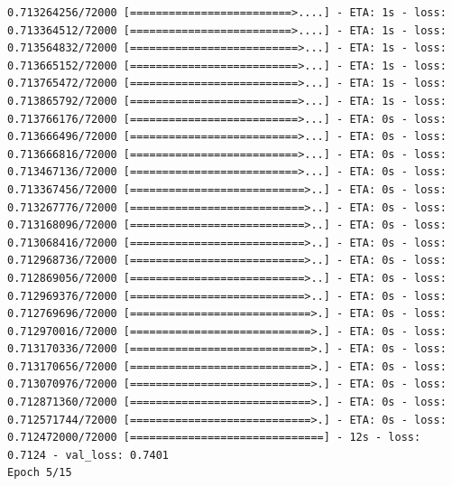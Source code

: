 \documentclass[12pt,fleqn]{article}\usepackage{../../common}
\begin{document}
\begin{verbatim}
0.713264256/72000 [=========================>....] - ETA: 1s - loss: 0.713364512/72000 [=========================>....] - ETA: 1s - loss: 0.713564832/72000 [==========================>...] - ETA: 1s - loss: 0.713665152/72000 [==========================>...] - ETA: 1s - loss: 0.713765472/72000 [==========================>...] - ETA: 1s - loss: 0.713865792/72000 [==========================>...] - ETA: 1s - loss: 0.713766176/72000 [==========================>...] - ETA: 0s - loss: 0.713666496/72000 [==========================>...] - ETA: 0s - loss: 0.713666816/72000 [==========================>...] - ETA: 0s - loss: 0.713467136/72000 [==========================>...] - ETA: 0s - loss: 0.713367456/72000 [===========================>..] - ETA: 0s - loss: 0.713267776/72000 [===========================>..] - ETA: 0s - loss: 0.713168096/72000 [===========================>..] - ETA: 0s - loss: 0.713068416/72000 [===========================>..] - ETA: 0s - loss: 0.712968736/72000 [===========================>..] - ETA: 0s - loss: 0.712869056/72000 [===========================>..] - ETA: 0s - loss: 0.712969376/72000 [===========================>..] - ETA: 0s - loss: 0.712769696/72000 [============================>.] - ETA: 0s - loss: 0.712970016/72000 [============================>.] - ETA: 0s - loss: 0.713170336/72000 [============================>.] - ETA: 0s - loss: 0.713170656/72000 [============================>.] - ETA: 0s - loss: 0.713070976/72000 [============================>.] - ETA: 0s - loss: 0.712871360/72000 [============================>.] - ETA: 0s - loss: 0.712571744/72000 [============================>.] - ETA: 0s - loss: 0.712472000/72000 [==============================] - 12s - loss: 0.7124 - val_loss: 0.7401
Epoch 5/15

\end{verbatim}
\end{document}
